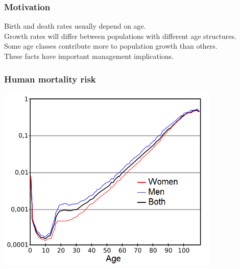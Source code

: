 \documentclass[color=usenames,dvipsnames]{beamer}\usepackage[]{graphicx}\usepackage[]{xcolor}
\begin{document}
\begin{frame}
  \frametitle{Motivation}
  \large
  Birth and death rates usually depend on age. \\
  \pause
  \vfill
  Growth rates will differ between populations with
  different age structures. \\
  \pause
  \vfill
  Some age classes contribute more to population growth than others. \\
  \pause
  \vfill
  These facts have important management implications. \\
\end{frame}




\begin{frame}
  \frametitle{Human mortality risk}
  \centering
  \includegraphics[width=0.8\textwidth]{figs/Mortality_by_age} \\
\end{frame}
\end{document}

